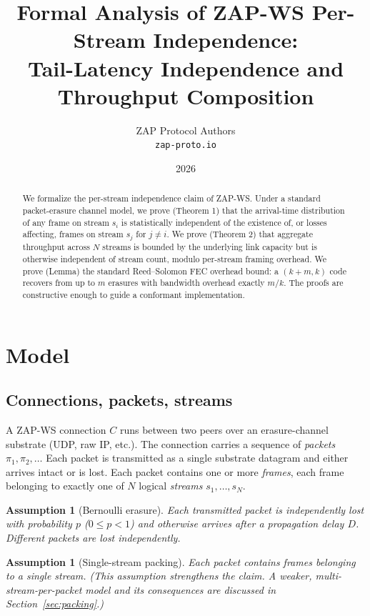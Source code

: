 \documentclass[11pt,a4paper]{article}
\title{Formal Analysis of ZAP-WS Per-Stream Independence:\\
Tail-Latency Independence and Throughput Composition}
\author{ZAP Protocol Authors\\
\texttt{zap-proto.io}}
\date{2026}
\newtheorem{assumption}[theorem]{Assumption}
\begin{document}
\maketitle

\begin{abstract}
We formalize the per-stream independence claim of ZAP-WS. Under a
standard packet-erasure channel model, we prove (Theorem 1) that the
arrival-time distribution of any frame on stream $s_i$ is statistically
independent of the existence of, or losses affecting, frames on stream
$s_j$ for $j \ne i$. We prove (Theorem 2) that aggregate throughput
across $N$ streams is bounded by the underlying link capacity but is
otherwise independent of stream count, modulo per-stream framing
overhead. We prove (Lemma) the standard Reed--Solomon FEC overhead
bound: a $(k+m, k)$ code recovers from up to $m$ erasures with bandwidth
overhead exactly $m/k$. The proofs are constructive enough to guide a
conformant implementation.
\end{abstract}

\section{Model}

\subsection{Connections, packets, streams}

A ZAP-WS connection $C$ runs between two peers over an erasure-channel
substrate (UDP, raw IP, etc.). The connection carries a sequence of
\emph{packets} $\pi_1, \pi_2, \ldots$ Each packet is transmitted as a
single substrate datagram and either arrives intact or is lost. Each
packet contains one or more \emph{frames}, each frame belonging to
exactly one of $N$ logical \emph{streams} $s_1, \ldots, s_N$.

\begin{assumption}[Bernoulli erasure]\label{ass:erasure}
Each transmitted packet is independently lost with probability $p$
($0 \le p < 1$) and otherwise arrives after a propagation delay $D$.
Different packets are lost independently.
\end{assumption}

\begin{assumption}[Single-stream packing]\label{ass:packing}
Each packet contains frames belonging to a single stream. (This
assumption strengthens the claim. A weaker, multi-stream-per-packet
model and its consequences are discussed in Section~\ref{sec:packing}.)
\end{assumption}
\end{document}
